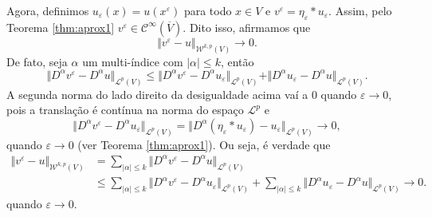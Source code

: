 \documentclass[a4paper, 11pt]{book}
\theoremstyle{definition}
\newcommand{\cC}{\mathcal{C}}
\newcommand{\cL}{\mathcal{L}}
\newcommand{\cW}{\mathcal{W}}
\begin{document}
\begin{prf}
    Agora, definimos $u_\varepsilon(x) = u(x^\varepsilon)$ para todo $x \in V$ e $v^\varepsilon = \eta_\varepsilon * u_\varepsilon$. Assim, pelo Teorema \ref{thm:aprox1} $v^\varepsilon \in \cC^{\infty}(\overline{V})$. 
    Dito isso, afirmamos que
    \[
        \Vert v^\varepsilon - u \Vert_{\cW^{k,p}(V)} \to 0.
    \]
    De fato, seja $\alpha $ um multi-índice com $|\alpha| \leqslant k$, então
    \[
        \Vert D^\alpha v^\varepsilon - D^\alpha u \Vert_{\cL^p(V)} \leqslant \Vert D^\alpha v^\varepsilon - D^\alpha u_\varepsilon \Vert_{\cL^p(V)} + \Vert D^\alpha u_\varepsilon - D^\alpha u \Vert_{\cL^p(V)}.
    \]
   A segunda norma do lado direito da desigualdade acima vaí a $0$ quando $\varepsilon \to 0$, pois a translação é contínua na norma do espaço $\cL^p$ e
    \[
        \Vert D^\alpha v^\varepsilon - D^\alpha u_\varepsilon \Vert_{\cL^p(V)} = \Vert D^\alpha (\eta_\varepsilon * u_\varepsilon) - u_\varepsilon \Vert_{\cL^p(V)} \to 0,
    \]
    quando $\varepsilon \to 0$ (ver Teorema \ref{thm:aprox1}). Ou seja, é verdade que
    \[
        \begin{aligned}
            \Vert v^\varepsilon - u \Vert_{\cW^{k,p}(V)} &= \sum_{|\alpha| \leqslant k} \Vert D^\alpha v^\varepsilon - D^\alpha u \Vert_{\cL^p(V)} \\
            &\leqslant \sum_{|\alpha| \leqslant k} \Vert D^\alpha v^\varepsilon - D^\alpha u_\varepsilon \Vert_{\cL^p(V)} + \sum_{|\alpha| \leqslant k} \Vert D^\alpha u_\varepsilon - D^\alpha u \Vert_{\cL^p(V)} \to 0.
        \end{aligned}
    \]
    quando $\varepsilon \to 0$.


\end{prf}
\end{document}
